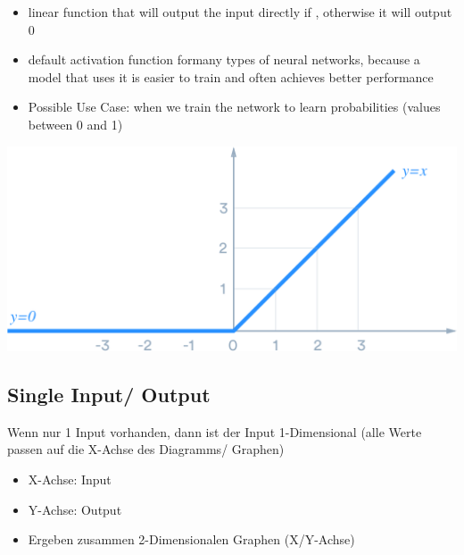 \begin{minipage}{0.5\linewidth}
\begin{itemize}
    \item linear function that will output the input directly if , otherwise it will output 0
    \item default activation function formany types of neural networks, because a model that uses it is easier to train and often achieves better performance
    \item Possible Use Case: when we train the network to learn probabilities (values between 0 and 1)
\end{itemize}
\end{minipage}
\begin{minipage}{0.5\linewidth}
\begin{center}
    \includegraphics[width=\linewidth]{./img/relu.png}
\end{center}
\end{minipage}




\subsection{Single Input/ Output}
Wenn nur 1 Input vorhanden, dann ist der Input 1-Dimensional (alle Werte passen auf die X-Achse des Diagramms/ Graphen)
\begin{itemize}
    \item X-Achse: Input
    \item Y-Achse: Output
    \item Ergeben zusammen 2-Dimensionalen Graphen (X/Y-Achse)
\end{itemize}


